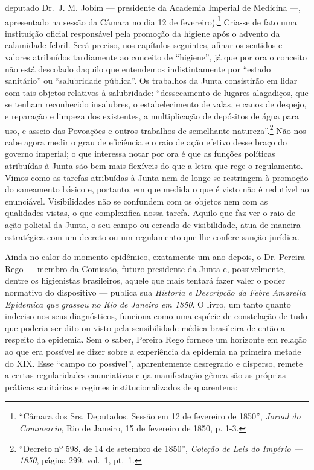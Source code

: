 deputado Dr.~J. M. Jobim --- presidente da Academia Imperial de Medicina
---, apresentado na sessão da Câmara no dia 12 de fevereiro).\footnote{``Câmara
  dos Srs. Deputados. Sessão em 12 de fevereiro de 1850'', \textit{Jornal
  do Commercio}, Rio de Janeiro, 15 de fevereiro de 1850, p. 1-3.}
Cria-se de fato uma instituição oficial responsável pela promoção da
higiene após o advento da calamidade febril. Será preciso, nos capítulos
seguintes, afinar os sentidos e valores atribuídos tardiamente ao
conceito de ``higiene'', já que por ora o conceito não está descolado
daquilo que entendemos indistintamente por ``estado sanitário'' ou
``salubridade pública''. Os trabalhos da Junta consistirão em lidar com
tais objetos relativos à salubridade: ``dessecamento de lugares
alagadiços, que se tenham reconhecido insalubres, o estabelecimento de
valas, e canos de despejo, e reparação e limpeza dos existentes, a
multiplicação de depósitos de água para uso, e asseio das Povoações e
outros trabalhos de semelhante natureza''.\footnote{``Decreto nº 598, de
  14 de setembro de 1850'', \textit{Coleção de Leis do Império --- 1850},
  página 299. vol.~1, pt.~1.} Não nos cabe agora medir o grau de
eficiência e o raio de ação efetivo desse braço do governo imperial; o
que interessa notar por ora é que as funções políticas atribuídas à
Junta são bem mais flexíveis do que a letra que rege o regulamento.
Vimos como as tarefas atribuídas à Junta nem de longe se restringem à
promoção do saneamento básico e, portanto, em que medida o que é visto
não é redutível ao enunciável. Visibilidades não se confundem com os
objetos nem com as qualidades vistas, o que complexifica nossa tarefa.
Aquilo que faz ver o raio de ação policial da Junta, o seu campo ou
cercado de visibilidade, atua de maneira estratégica com um decreto ou
um regulamento que lhe confere sanção jurídica.

Ainda no calor do momento epidêmico, exatamente um ano depois, o Dr.
Pereira Rego --- membro da Comissão, futuro presidente da Junta e,
possivelmente, dentre os higienistas brasileiros, aquele que mais
tentará fazer valer o poder normativo do dispositivo --- publica sua
\textit{Historia e Descripção da Febre Amarella Epidemica que grassou no
Rio de Janeiro em 1850}. O livro, um tanto quanto indeciso nos seus
diagnósticos, funciona como uma espécie de constelação de tudo que
poderia ser dito ou visto pela sensibilidade médica brasileira de então
a respeito da epidemia. Sem o saber, Pereira Rego fornece um horizonte
em relação ao que era possível se dizer sobre a experiência da epidemia
na primeira metade do XIX. Esse ``campo do possível'', aparentemente
desregrado e disperso, remete a certas regularidades enunciativas cuja
manifestação gêmea são as próprias práticas sanitárias e regimes
institucionalizados de quarentena:

